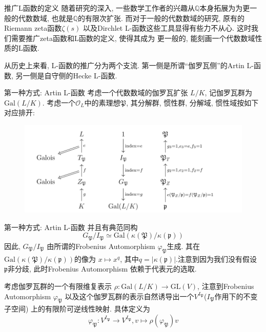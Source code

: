 \documentclass[aspectratio=169]{beamer}
\theoremstyle{definition}
\newcommand{\bb}[1]{\mathbb{#1}}
\begin{document}
\begin{frame}{推广L函数的定义}
    随着研究的深入, 一些数学工作者的兴趣从$\bb{Q}$本身拓展为为更一般的代数数域, 也就是$\bb{Q}$的有限次扩张. 
    而对于一般的代数数域的研究, 原有的Riemann zeta函数$\zeta(s)$
    以及Dirchlet L-函数这些工具显得有些力不从心.
    这时我们需要推广zeta函数和L函数的定义, 使得其成为
    更一般的, 能刻画一个代数数域性质的L函数. 

    从历史上来看, L-函数的推广分为两个支流.
    第一侧是所谓“伽罗瓦侧”的Artin L-函数, 另一侧是自守侧的Hecke L-函数. 
    
\end{frame}

\begin{frame}{第一种方式: Artin L-函数}
考虑一个代数数域的伽罗瓦扩张
$L/K$, 记伽罗瓦群为$\text{Gal}(L/K)$. 考虑一个$\mathcal{O}_L$中的素理想$\mathfrak{P}$, 
其分解群, 惯性群, 分解域, 惯性域按如下对应排开: 
\begin{figure}
    \includegraphics[height=0.5\textheight]{artin-L.png}
\end{figure}

\end{frame}
\begin{frame}{第一种方式: Artin L-函数}
    并且有典范同构
    $$
    G_{\mathfrak{P}} / I_{\mathfrak{P}}\simeq \text{Gal}(\kappa(\mathfrak{P})/\kappa(\mathfrak{p}))
    $$
    因此, $G_{\mathfrak{P}} / I_{\mathfrak{P}}$ 由所谓的Frobenius Automorphism 
    $\varphi_{\mathfrak{P}}$生成.
    其在$\text{Gal}(\kappa(\mathfrak{P})/\kappa(\mathfrak{p}))$的像为
    $x \mapsto x^q$, 其中$q=|\kappa(\mathfrak{p})|$.注意到因为我们没有假设
    $\mathfrak{p}$非分歧, 此时Frobenius Automorphism 依赖于代表元的选取. 
    
    考虑伽罗瓦群的一个有限维复表示
    $\rho: \text{Gal}(L/K)\rightarrow \text{GL}(V)$, 注意到Frobenius Automorphism 
    $\varphi_{\mathfrak{P}}$ 以及这个伽罗瓦群的表示自然诱导出一个$V^{I_\mathfrak{P}}$($I_\mathfrak{P}$作用下的不变子空间)
    上的有限阶可逆线性映射. 具体定义为
    \begin{equation*}
        \varphi_{\mathfrak{P}}: V^{I_\mathfrak{P}}\rightarrow V^{I_\mathfrak{P}}, v\mapsto \rho(\varphi_{\mathfrak{P}})v 
    \end{equation*} 
\end{frame}
\end{document}
